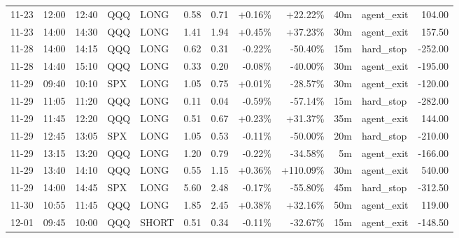 \documentclass[11pt,a4paper,twoside]{article}
\begin{document}
\begin{center}
\begin{longtable}{>{\color{txtmain}}l l l l l r r r r r >{\color{txtmain}}l r}
11-23 & 12:00 & 12:40 & QQQ & LONG & 0.58 & 0.71 & \textcolor{wingreen}{+0.16\%} & \textcolor{wingreen}{+22.22\%} & 40m & agent\_exit & \textcolor{wingreen}{104.00} \\
11-23 & 14:00 & 14:30 & QQQ & LONG & 1.41 & 1.94 & \textcolor{wingreen}{+0.45\%} & \textcolor{wingreen}{+37.23\%} & 30m & agent\_exit & \textcolor{wingreen}{157.50} \\
11-28 & 14:00 & 14:15 & QQQ & LONG & 0.62 & 0.31 & \textcolor{lossred}{-0.22\%} & \textcolor{lossred}{-50.40\%} & 15m & hard\_stop & \textcolor{lossred}{-252.00} \\
11-28 & 14:40 & 15:10 & QQQ & LONG & 0.33 & 0.20 & \textcolor{lossred}{-0.08\%} & \textcolor{lossred}{-40.00\%} & 30m & agent\_exit & \textcolor{lossred}{-195.00} \\
11-29 & 09:40 & 10:10 & SPX & LONG & 1.05 & 0.75 & \textcolor{wingreen}{+0.01\%} & \textcolor{lossred}{-28.57\%} & 30m & agent\_exit & \textcolor{lossred}{-120.00} \\
11-29 & 11:05 & 11:20 & QQQ & LONG & 0.11 & 0.04 & \textcolor{lossred}{-0.59\%} & \textcolor{lossred}{-57.14\%} & 15m & hard\_stop & \textcolor{lossred}{-282.00} \\
11-29 & 11:45 & 12:20 & QQQ & LONG & 0.51 & 0.67 & \textcolor{wingreen}{+0.23\%} & \textcolor{wingreen}{+31.37\%} & 35m & agent\_exit & \textcolor{wingreen}{144.00} \\
11-29 & 12:45 & 13:05 & SPX & LONG & 1.05 & 0.53 & \textcolor{lossred}{-0.11\%} & \textcolor{lossred}{-50.00\%} & 20m & hard\_stop & \textcolor{lossred}{-210.00} \\
11-29 & 13:15 & 13:20 & QQQ & LONG & 1.20 & 0.79 & \textcolor{lossred}{-0.22\%} & \textcolor{lossred}{-34.58\%} & 5m & agent\_exit & \textcolor{lossred}{-166.00} \\
11-29 & 13:40 & 14:10 & QQQ & LONG & 0.55 & 1.15 & \textcolor{wingreen}{+0.36\%} & \textcolor{wingreen}{+110.09\%} & 30m & agent\_exit & \textcolor{wingreen}{540.00} \\
11-29 & 14:00 & 14:45 & SPX & LONG & 5.60 & 2.48 & \textcolor{lossred}{-0.17\%} & \textcolor{lossred}{-55.80\%} & 45m & hard\_stop & \textcolor{lossred}{-312.50} \\
11-30 & 10:55 & 11:45 & QQQ & LONG & 1.85 & 2.45 & \textcolor{wingreen}{+0.38\%} & \textcolor{wingreen}{+32.16\%} & 50m & agent\_exit & \textcolor{wingreen}{119.00} \\
12-01 & 09:45 & 10:00 & QQQ & SHORT & 0.51 & 0.34 & \textcolor{lossred}{-0.11\%} & \textcolor{lossred}{-32.67\%} & 15m & agent\_exit & \textcolor{lossred}{-148.50} \\

\end{longtable}
\end{center}
\end{document}
